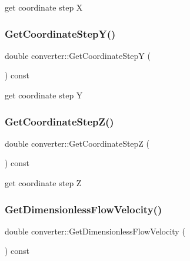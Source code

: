 get coordinate step X 

\mbox{\label{classconverter_acaf40a138024b759fb53b58257a57c32}} 
\subsubsection{\texorpdfstring{Get\+Coordinate\+Step\+Y()}{GetCoordinateStepY()}}
{\footnotesize\ttfamily double converter\+::\+Get\+Coordinate\+StepY (\begin{DoxyParamCaption}{ }\end{DoxyParamCaption}) const}



get coordinate step Y 

\mbox{\label{classconverter_af2f9301cdbcd2a6686d57f70eaebde67}} 
\subsubsection{\texorpdfstring{Get\+Coordinate\+Step\+Z()}{GetCoordinateStepZ()}}
{\footnotesize\ttfamily double converter\+::\+Get\+Coordinate\+StepZ (\begin{DoxyParamCaption}{ }\end{DoxyParamCaption}) const}



get coordinate step Z 

\mbox{\label{classconverter_a89fabf7b30a0009ff92378357549846d}} 
\subsubsection{\texorpdfstring{Get\+Dimensionless\+Flow\+Velocity()}{GetDimensionlessFlowVelocity()}}
{\footnotesize\ttfamily double converter\+::\+Get\+Dimensionless\+Flow\+Velocity (\begin{DoxyParamCaption}{ }\end{DoxyParamCaption}) const}



